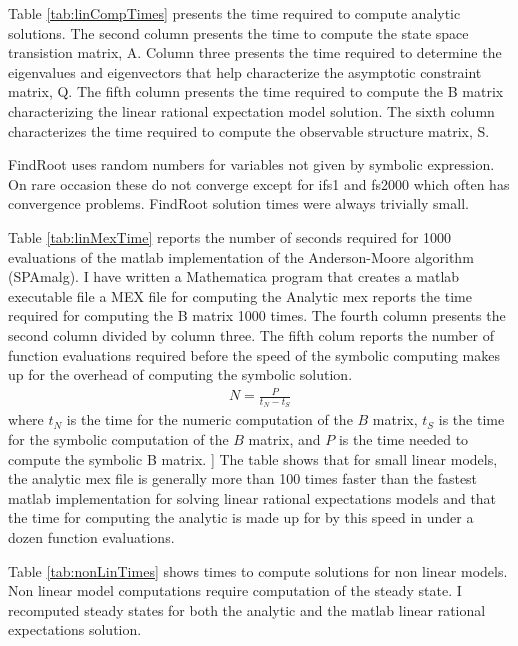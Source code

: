 \documentclass[12pt]{article}
\begin{document}




Table \ref{tab:linCompTimes} presents the time required to compute analytic 
solutions. 
The second column presents the time to compute the state space 
transistion matrix, A. Column three presents the time required to determine
the eigenvalues and eigenvectors that help characterize the asymptotic
constraint matrix, Q. The fifth column presents the time required to
compute the B matrix characterizing the linear rational expectation  model
solution.  The sixth column characterizes the time required to compute
the observable structure matrix, S.  

FindRoot uses random numbers for variables not given by symbolic expression.
On rare occasion these do not converge except for ifs1 and fs2000
 which often has convergence problems. 
FindRoot solution times were always trivially small.



Table \ref{tab:linMexTime} reports the number of seconds required for 1000 evaluations of
the matlab implementation of the Anderson-Moore algorithm (SPAmalg).
I have written a Mathematica program that creates a matlab executable file
a MEX file for computing the
Analytic mex reports the time required for computing the B matrix 1000 times.
The fourth column presents  the second column  divided by column three.
The fifth colum reports 
the number of function evaluations required before the speed of the
symbolic computing makes up for the overhead of
computing the symbolic solution.
\begin{gather*}
  N=\frac{P}{t_N-t_S}
\end{gather*}
where $t_N$ is the time for the numeric computation of the $B$ matrix,
$t_S$ is the time for the symbolic computation of the $B$ matrix, and
$P$ is the time needed to compute the symbolic B matrix.
]
The table shows that for small linear models, 
the analytic mex file is generally more than 100 times
faster than the fastest matlab implementation for solving linear rational
expectations models and that the time for computing the analytic is
made up for by this speed in under a dozen function evaluations.





Table \ref{tab:nonLinTimes} shows times to compute solutions for non linear
models. Non linear model computations require computation of the steady state.
I recomputed steady states for both the analytic and the matlab linear 
rational expectations solution.
\end{document}
